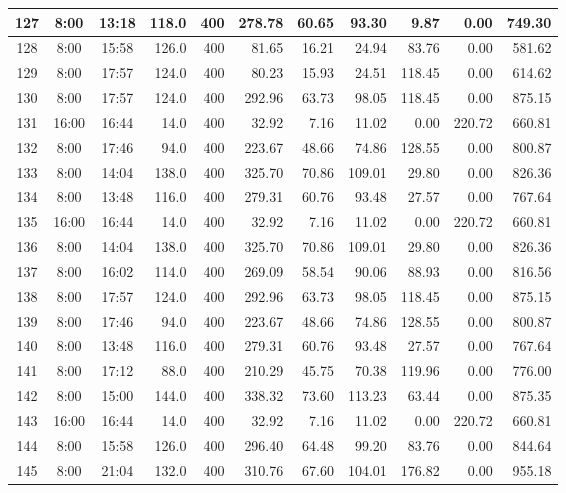 \begin{landscape}
\begin{longtable}{|c|c|c|r|r|r|r|r|r|r|r|}
\hline
\rowcolor{gray!8}
127 & 8:00 & 13:18 & 118.0 & 400 & 278.78 & 60.65 & 93.30 & 9.87 & 0.00 & 749.30 \\
\hline
128 & 8:00 & 15:58 & 126.0 & 400 & 81.65 & 16.21 & 24.94 & 83.76 & 0.00 & 581.62 \\
\hline
\rowcolor{gray!8}
129 & 8:00 & 17:57 & 124.0 & 400 & 80.23 & 15.93 & 24.51 & 118.45 & 0.00 & 614.62 \\
\hline
130 & 8:00 & 17:57 & 124.0 & 400 & 292.96 & 63.73 & 98.05 & 118.45 & 0.00 & 875.15 \\
\hline
\rowcolor{gray!8}
131 & 16:00 & 16:44 & 14.0 & 400 & 32.92 & 7.16 & 11.02 & 0.00 & 220.72 & 660.81 \\
\hline
132 & 8:00 & 17:46 & 94.0 & 400 & 223.67 & 48.66 & 74.86 & 128.55 & 0.00 & 800.87 \\
\hline
\rowcolor{gray!8}
133 & 8:00 & 14:04 & 138.0 & 400 & 325.70 & 70.86 & 109.01 & 29.80 & 0.00 & 826.36 \\
\hline
134 & 8:00 & 13:48 & 116.0 & 400 & 279.31 & 60.76 & 93.48 & 27.57 & 0.00 & 767.64 \\
\hline
\rowcolor{gray!8}
135 & 16:00 & 16:44 & 14.0 & 400 & 32.92 & 7.16 & 11.02 & 0.00 & 220.72 & 660.81 \\
\hline
136 & 8:00 & 14:04 & 138.0 & 400 & 325.70 & 70.86 & 109.01 & 29.80 & 0.00 & 826.36 \\
\hline
\rowcolor{gray!8}
137 & 8:00 & 16:02 & 114.0 & 400 & 269.09 & 58.54 & 90.06 & 88.93 & 0.00 & 816.56 \\
\hline
138 & 8:00 & 17:57 & 124.0 & 400 & 292.96 & 63.73 & 98.05 & 118.45 & 0.00 & 875.15 \\
\hline
\rowcolor{gray!8}
139 & 8:00 & 17:46 & 94.0 & 400 & 223.67 & 48.66 & 74.86 & 128.55 & 0.00 & 800.87 \\
\hline
140 & 8:00 & 13:48 & 116.0 & 400 & 279.31 & 60.76 & 93.48 & 27.57 & 0.00 & 767.64 \\
\hline
\rowcolor{gray!8}
141 & 8:00 & 17:12 & 88.0 & 400 & 210.29 & 45.75 & 70.38 & 119.96 & 0.00 & 776.00 \\
\hline
142 & 8:00 & 15:00 & 144.0 & 400 & 338.32 & 73.60 & 113.23 & 63.44 & 0.00 & 875.35 \\
\hline
\rowcolor{gray!8}
143 & 16:00 & 16:44 & 14.0 & 400 & 32.92 & 7.16 & 11.02 & 0.00 & 220.72 & 660.81 \\
\hline
144 & 8:00 & 15:58 & 126.0 & 400 & 296.40 & 64.48 & 99.20 & 83.76 & 0.00 & 844.64 \\
\hline
\rowcolor{gray!8}
145 & 8:00 & 21:04 & 132.0 & 400 & 310.76 & 67.60 & 104.01 & 176.82 & 0.00 & 955.18 \\

\end{longtable}
\end{landscape}
